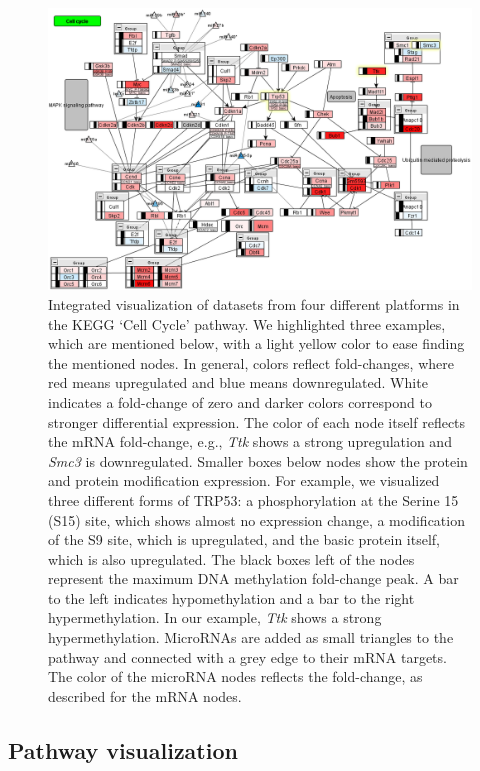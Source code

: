 \documentclass{bioinfo}
\begin{document}
\begin{figure}
\centering
\includegraphics[width=.675\textwidth]{figures/mmu04110_highlight.png}
\caption{Integrated visualization of datasets from four different platforms in the KEGG `Cell Cycle' pathway.
We highlighted three examples, which are mentioned below, with a light yellow color to ease
finding the mentioned nodes.
In general, colors reflect fold-changes, where red means upregulated and blue means
downregulated. White indicates a fold-change of zero and darker colors correspond to stronger
differential expression. The color of each node itself reflects the mRNA fold-change, e.g., \emph{Ttk}
shows a strong upregulation and \emph{Smc3} is downregulated. Smaller boxes below nodes show the protein
and protein modification expression. For example, we visualized three different forms of TRP53: a
phosphorylation at the Serine 15 (S15) site, which shows almost no expression change, a modification
of the S9 site, which is upregulated, and the basic protein itself, which is also upregulated.  The
black boxes left of the nodes represent the maximum DNA methylation fold-change peak. A bar to the
left indicates hypomethylation and a bar to the right hypermethylation. In our example, \emph{Ttk} shows
a strong hypermethylation. MicroRNAs are added as small triangles to the pathway and connected with
a grey edge to their mRNA targets. The color of the microRNA nodes reflects the fold-change, as
described for the mRNA nodes.}
\label{fig:cellcycle}
\end{figure}

\subsection{Pathway visualization}
\end{document}
